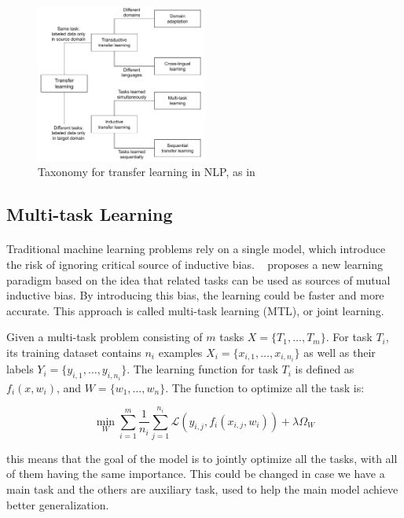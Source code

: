 \begin{figure}[]
        \centering
        \includegraphics[width=0.5\textwidth]{images/NLP_Transfer_Learning_Taxonomy.pdf}
        \caption{Taxonomy for transfer learning in NLP, as in~\citep{ruder2019neural}}
        \label{fig:nlp_transfer_taxonomy}
\end{figure}%


\subsection{Multi-task Learning}
\paragraph{}
Traditional machine learning problems rely on a single model, which introduce the risk of ignoring critical source of inductive bias. ~\cite{caruana1993mtl} proposes a new learning paradigm based on the idea that related tasks can be used as sources of mutual inductive bias. By introducing this bias, the learning could be faster and more accurate. This approach is called multi-task learning (MTL), or joint learning. 

Given a multi-task problem consisting of $m$ tasks $X = \{T_{1}, \dots, T_{m}\}$. For task $T_i$, its training dataset contains $n_i$ examples $X_i = \{x_{i, 1}, \dots, x_{i, n_i}\}$ as well as their labels $Y_i = \{y_{i, 1}, \dots, y_{i, n_i}\}$. The learning function for task $T_i$ is defined as $f_i(x, w_i)$, and $W = \{w_1, \dots, w_n\}$. The function to optimize all the task is:

\begin{equation}
\min_{W} \sum_{i=1}^{m} \frac{1}{n_{i}} \sum_{j=1}^{n_{i}} \mathcal{L}\left(y_{i, j}, f_i(x_{i,j}, w_i)\right) + \lambda\Omega_W
\end{equation}

this means that the goal of the model is to jointly optimize all the tasks, with all of them having the same importance. This could be changed in case we have a main task and the others are auxiliary task, used to help the main model achieve better generalization.

